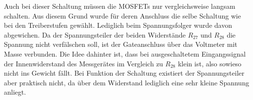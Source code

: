 Auch bei dieser Schaltung müssen die MOSFETs nur vergleichsweise langsam schalten. Aus diesem Grund wurde für deren Anschluss die selbe Schaltung wie bei den Treiberstufen gewählt. Lediglich beim Spannungsfolger wurde davon abgewichen. Da der Spannungsteiler der beiden Widerstände $R_{27}$ und $R_{28}$ die Spannung nicht verfälschen soll, ist der Gateanschluss über das Voltmeter mit Masse verbunden. Die Idee dahinter ist, dass bei ausgeschaltetem Eingangssignal der Innenwiderstand des Messgerätes im Vergleich zu $R_{28}$ klein ist, also sowieso nicht ins Gewicht fällt. Bei Funktion der Schaltung existiert der Spannungsteiler aber praktisch nicht, da über dem Widerstand lediglich eine sehr kleine Spannung anliegt.